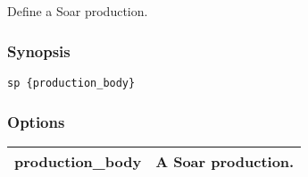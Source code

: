 \subsection{}
\label{sp}
Define a Soar production. 
\subsubsection*{Synopsis}
\begin{verbatim}
sp {production_body}
\end{verbatim}
\subsubsection*{Options}
\begin{tabular}{|l|l|}
\hline 
 production\_body  & A Soar production.  \\
 \hline 
\end{tabular}
